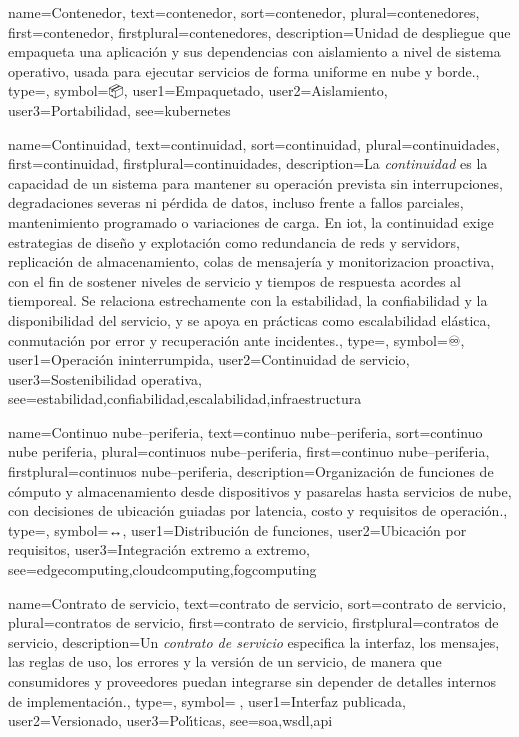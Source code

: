 	{
		name={Contenedor},
		text={contenedor},
		sort={contenedor},
		plural={contenedores},
		first={contenedor},
		firstplural={contenedores},
		description={Unidad de despliegue que empaqueta una aplicaci{\'o}n y sus dependencias con aislamiento a nivel de sistema operativo, usada para ejecutar servicios de forma uniforme en nube y borde.},
		type=\glsdefaulttype,
		symbol={📦},
		user1={Empaquetado},
		user2={Aislamiento},
		user3={Portabilidad},
		see={kubernetes}
	}
	
	{
		name={Continuidad},
		text={continuidad},
		sort={continuidad},
		plural={continuidades},
		first={continuidad},
		firstplural={continuidades},
		description={La \emph{continuidad} es la capacidad de un \gls{sistema} para mantener su operaci{\'o}n prevista sin interrupciones, degradaciones severas ni p{\'e}rdida de \glspl{dato}, incluso frente a fallos parciales, mantenimiento programado o variaciones de carga. En \gls{iot}, la continuidad exige estrategias de dise{\~n}o y explotaci{\'o}n como redundancia de \glspl{red} y \glspl{servidor}, replicaci{\'o}n de \gls{almacenamiento}, colas de mensajer{\'i}a y \gls{monitorizacion} proactiva, con el fin de sostener niveles de servicio y tiempos de respuesta acordes al \gls{tiemporeal}. Se relaciona estrechamente con la \gls{estabilidad}, la \gls{confiabilidad} y la disponibilidad del servicio, y se apoya en pr{\'a}cticas como \gls{escalabilidad} el{\'a}stica, conmutaci{\'o}n por error y recuperaci{\'o}n ante incidentes.},
		type=\glsdefaulttype,
		symbol={♾️},
		user1={Operaci{\'o}n ininterrumpida},
		user2={Continuidad de servicio},
		user3={Sostenibilidad operativa},
		see={estabilidad,confiabilidad,escalabilidad,infraestructura}
	}
	
	{
		name={Continuo nube--periferia},
		text={continuo nube--periferia},
		sort={continuo nube periferia},
		plural={continuos nube--periferia},
		first={continuo nube--periferia},
		firstplural={continuos nube--periferia},
		description={Organizaci{\'o}n de funciones de c{\'o}mputo y almacenamiento desde dispositivos y pasarelas hasta servicios de nube, con decisiones de ubicaci{\'o}n guiadas por \gls{latencia}, costo y requisitos de operaci{\'o}n.},
		type=\glsdefaulttype,
		symbol={↔️},
		user1={Distribuci{\'o}n de funciones},
		user2={Ubicaci{\'o}n por requisitos},
		user3={Integraci{\'o}n extremo a extremo},
		see={edgecomputing,cloudcomputing,fogcomputing}
	}
	
	{
		name={Contrato de servicio},
		text={contrato de servicio},
		sort={contrato de servicio},
		plural={contratos de servicio},
		first={contrato de servicio},
		firstplural={contratos de servicio},
		description={Un \emph{contrato de servicio} especifica la interfaz, los mensajes, las reglas de uso, los errores y la versi{\'o}n de un \gls{servicio}, de manera que consumidores y proveedores puedan integrarse sin depender de detalles internos de implementaci{\'o}n.},
		type=\glsdefaulttype,
		symbol={📜},
		user1={Interfaz publicada},
		user2={Versionado},
		user3={Pol{\'\i}ticas},
		see={soa,wsdl,api}
	}
	
